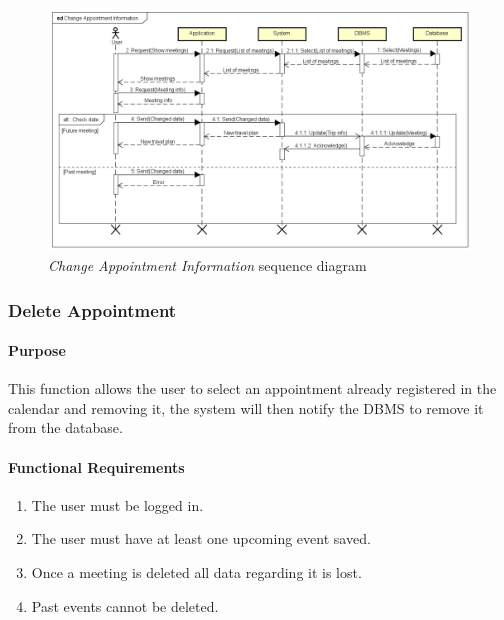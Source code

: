 \begin{figure}
	\includegraphics[width=\textheight, height=\textwidth, keepaspectratio=true]{Img/ChangeAppointmentInformationSQ}
	\caption{\emph{Change Appointment Information} sequence diagram}
	\label{fig:ChangeAppointmentInformationSQ}
\end{figure}

\clearpage
\subsubsection{Delete Appointment}
\paragraph*{Purpose\\}
This function allows the user to select an appointment already registered in the calendar and removing it, the system will then notify the DBMS to remove it from the database.
\paragraph*{Functional Requirements}
\begin{enumerate}[label=R.\arabic*:,resume]
	\item The user must be logged in.
	\item The user must have at least one upcoming event saved.
	\item Once a meeting is deleted all data regarding it is lost.
	\item Past events cannot be deleted.
\end{enumerate}

